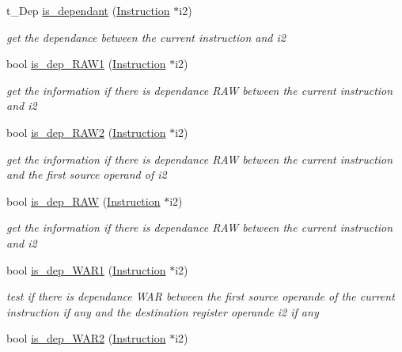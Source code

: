 \begin{DoxyCompactItemize}
\item 
t\-\_\-\-Dep \hyperlink{classInstruction_ac8d86b800140a08cb03d82f83f363fa4}{is\-\_\-dependant} (\hyperlink{classInstruction}{\-Instruction} $\ast$i2)
\begin{DoxyCompactList}\small\item\em get the dependance between the current instruction and i2 \end{DoxyCompactList}\item 
bool \hyperlink{classInstruction_ae5d54f535adab416c53eb0ff6a438804}{is\-\_\-dep\-\_\-\-R\-A\-W1} (\hyperlink{classInstruction}{\-Instruction} $\ast$i2)
\begin{DoxyCompactList}\small\item\em get the information if there is dependance \-R\-A\-W between the current instruction and i2 \end{DoxyCompactList}\item 
bool \hyperlink{classInstruction_aa28ae5f427ee02c96466f1ac68060f87}{is\-\_\-dep\-\_\-\-R\-A\-W2} (\hyperlink{classInstruction}{\-Instruction} $\ast$i2)
\begin{DoxyCompactList}\small\item\em get the information if there is dependance \-R\-A\-W between the current instruction and the first source operand of i2 \end{DoxyCompactList}\item 
bool \hyperlink{classInstruction_a4c902c5a8fdc8c8841ec24f389605fd5}{is\-\_\-dep\-\_\-\-R\-A\-W} (\hyperlink{classInstruction}{\-Instruction} $\ast$i2)
\begin{DoxyCompactList}\small\item\em get the information if there is dependance \-R\-A\-W between the current instruction and i2 \end{DoxyCompactList}\item 
bool \hyperlink{classInstruction_a36c0faedd74af14b403ba7063af5d07f}{is\-\_\-dep\-\_\-\-W\-A\-R1} (\hyperlink{classInstruction}{\-Instruction} $\ast$i2)
\begin{DoxyCompactList}\small\item\em test if there is dependance \-W\-A\-R between the first source operande of the current instruction if any and the destination register operande i2 if any \end{DoxyCompactList}\item 
bool \hyperlink{classInstruction_a04471df677984f67ec13de88f55e3703}{is\-\_\-dep\-\_\-\-W\-A\-R2} (\hyperlink{classInstruction}{\-Instruction} $\ast$i2)

\end{DoxyCompactItemize}
